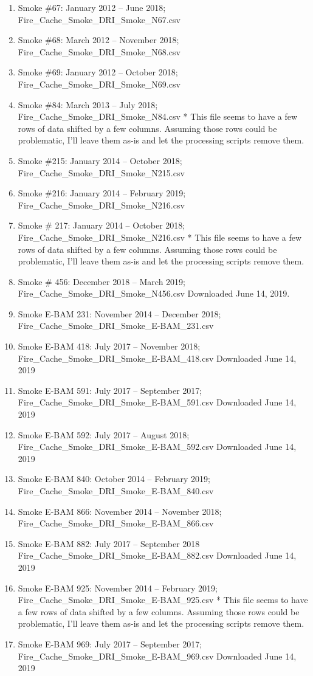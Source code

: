 \begin{enumerate}
\begin{enumerate}[nolistsep]
\item Smoke \#67: January 2012 -- June 2018; Fire\_Cache\_Smoke\_DRI\_Smoke\_N67.csv
\item Smoke \#68: March 2012 -- November 2018; Fire\_Cache\_Smoke\_DRI\_Smoke\_N68.csv
\item Smoke \#69: January 2012 -- October 2018; Fire\_Cache\_Smoke\_DRI\_Smoke\_N69.csv
\item Smoke \#84: March 2013 -- July 2018; Fire\_Cache\_Smoke\_DRI\_Smoke\_N84.csv * This file seems to have a few rows of data shifted by a few columns. Assuming those rows could be problematic, I'll leave them as-is and let the processing scripts remove them.
\item Smoke \#215: January 2014 -- October 2018; Fire\_Cache\_Smoke\_DRI\_Smoke\_N215.csv
\item Smoke \#216: January 2014 -- February 2019; Fire\_Cache\_Smoke\_DRI\_Smoke\_N216.csv
\item Smoke \# 217: January 2014 -- October 2018; Fire\_Cache\_Smoke\_DRI\_Smoke\_N216.csv * This file seems to have a few rows of data shifted by a few columns. Assuming those rows could be problematic, I'll leave them as-is and let the processing scripts remove them.
\item Smoke \# 456: December 2018 -- March 2019; Fire\_Cache\_Smoke\_DRI\_Smoke\_N456.csv Downloaded June 14, 2019.
\item Smoke E-BAM 231: November 2014 -- December 2018; Fire\_Cache\_Smoke\_DRI\_Smoke\_E-BAM\_231.csv
\item Smoke E-BAM 418: July 2017 -- November 2018; Fire\_Cache\_Smoke\_DRI\_Smoke\_E-BAM\_418.csv Downloaded June 14, 2019 %
\item Smoke E-BAM 591: July 2017 -- September 2017; Fire\_Cache\_Smoke\_DRI\_Smoke\_E-BAM\_591.csv Downloaded June 14, 2019 %
\item Smoke E-BAM 592: July 2017 -- August 2018; Fire\_Cache\_Smoke\_DRI\_Smoke\_E-BAM\_592.csv Downloaded June 14, 2019 %
\item Smoke E-BAM 840: October 2014 -- February 2019; Fire\_Cache\_Smoke\_DRI\_Smoke\_E-BAM\_840.csv
\item Smoke E-BAM 866: November 2014 -- November 2018; Fire\_Cache\_Smoke\_DRI\_Smoke\_E-BAM\_866.csv
\item Smoke E-BAM 882: July 2017 -- September 2018  Fire\_Cache\_Smoke\_DRI\_Smoke\_E-BAM\_882.csv Downloaded June 14, 2019 %
\item Smoke E-BAM 925: November 2014 -- February 2019; Fire\_Cache\_Smoke\_DRI\_Smoke\_E-BAM\_925.csv * This file seems to have a few rows of data shifted by a few columns. Assuming those rows could be problematic, I'll leave them as-is and let the processing scripts remove them.
\item Smoke E-BAM 969: July 2017 -- September 2017;  Fire\_Cache\_Smoke\_DRI\_Smoke\_E-BAM\_969.csv Downloaded June 14, 2019 %
\end{enumerate}


\end{enumerate}
